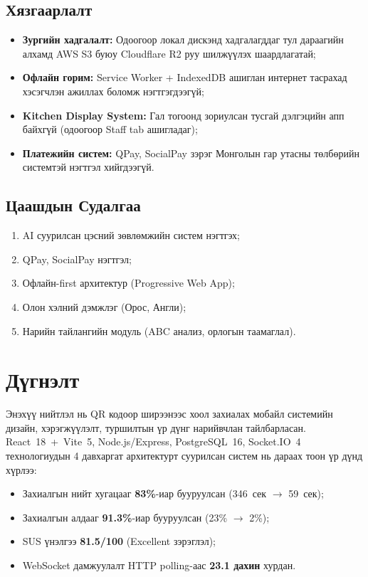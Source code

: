 \documentclass[12pt,a4paper]{article}
\begin{document}
\subsection{Хязгаарлалт}

\begin{itemize}
  \item \textbf{Зургийн хадгалалт:} Одоогоор локал дискэнд
        хадгалагддаг тул дараагийн алхамд AWS S3 буюу
        Cloudflare R2 руу шилжүүлэх шаардлагатай;
  \item \textbf{Офлайн горим:} Service Worker + IndexedDB
        ашиглан интернет тасрахад хэсэгчлэн ажиллах боломж
        нэгтгэгдээгүй;
  \item \textbf{Kitchen Display System:} Гал тогоонд зориулсан
        тусгай дэлгэцийн апп байхгүй (одоогоор Staff tab ашигладаг);
  \item \textbf{Платежийн систем:} QPay, SocialPay зэрэг
        Монголын гар утасны төлбөрийн системтэй нэгтгэл хийгдээгүй.
\end{itemize}

\subsection{Цаашдын Судалгаа}

\begin{enumerate}[leftmargin=1.5cm]
  \item AI суурилсан цэсний зөвлөмжийн систем нэгтгэх;
  \item QPay, SocialPay нэгтгэл;
  \item Офлайн-first архитектур (Progressive Web App);
  \item Олон хэлний дэмжлэг (Орос, Англи);
  \item Нарийн тайлангийн модуль (ABC анализ, орлогын таамаглал).
\end{enumerate}

\section{Дүгнэлт}
\label{sec:conclusion}

Энэхүү нийтлэл нь QR кодоор ширээнээс хоол захиалах мобайл
системийн дизайн, хэрэгжүүлэлт, туршилтын үр дүнг нарийвчлан
тайлбарласан. React~18~+~Vite~5, Node.js/Express, PostgreSQL~16,
Socket.IO~4 технологиудын 4 давхаргат архитектурт суурилсан систем нь
дараах тоон үр дүнд хүрлээ:

\begin{itemize}
  \item Захиалгын нийт хугацааг \textbf{83\%}-иар бууруулсан
        (346~сек $\to$ 59~сек);
  \item Захиалгын алдааг \textbf{91.3\%}-иар бууруулсан
        (23\% $\to$ 2\%);
  \item SUS үнэлгээ \textbf{81.5/100} (Excellent зэрэглэл);
  \item WebSocket дамжуулалт HTTP polling-аас \textbf{23.1 дахин} хурдан.
\end{itemize}
\end{document}
